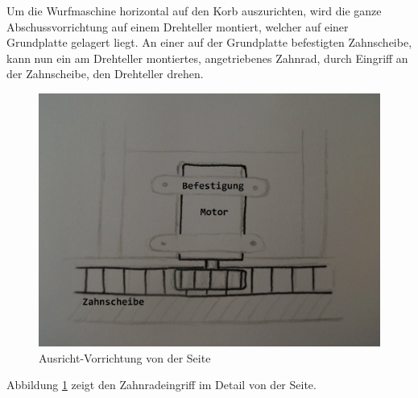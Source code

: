 Um die Wurfmaschine horizontal auf den Korb auszurichten, wird die ganze Abschussvorrichtung auf einem Drehteller montiert, welcher auf einer Grundplatte gelagert liegt. An einer auf der Grundplatte befestigten Zahnscheibe, kann nun ein am Drehteller montiertes, angetriebenes Zahnrad, durch Eingriff an der Zahnscheibe, den Drehteller drehen.

\begin{figure}[h!]
	\centering
	\includegraphics[scale=0.35]{../../fig/Ausrichtvorrichtung_Detail.jpg}
	\caption{Ausricht-Vorrichtung von der Seite}
	\label{fig:ausricht-vorrichtung-von-der-seite}
\end{figure}
Abbildung \ref{fig:ausricht-vorrichtung-von-der-seite} zeigt den Zahnradeingriff im Detail von der Seite.
